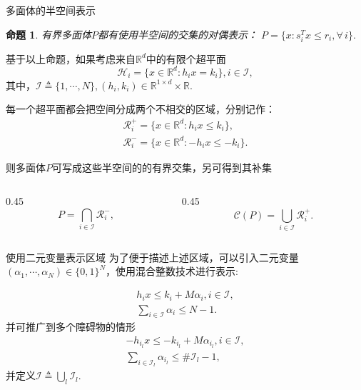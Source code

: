 \documentclass[notheorems,11pt]{beamer}
\theoremstyle{plain}
\numberwithin{theorem}{section}
\numberwithin{lemma}{section}
\newtheorem{proposition}{命题}
\numberwithin{corollary}{section}
\theoremstyle{example}
\begin{document}
\begin{frame}{多面体的半空间表示}
    \begin{proposition}{}
    有界多面体$P$都有使用半空间的交集的对偶表示：
    $P=\{x:s_i^Tx\leqslant r_i,\forall\, i\}.$
  \end{proposition}
    基于以上命题，如果考虑来自$\mathbb{R}^d$中的有限个超平面
  \begin{equation}
    \mathcal{H}_i=\{x\in\mathbb{R}^d:h_ix=k_i\},i\in\mathcal{I},
  \end{equation}
  其中，$\mathcal{I}\triangleq \{1,\cdots,N\},(h_i,k_i)\in\mathbb{R}^{1\times d}\times\mathbb{R}.$\par
  每一个超平面都会把空间分成两个不相交的区域，分别记作：
  \begin{subequations}
    \begin{gather}
    \mathcal{R}^+_i=\{x\in\mathbb{R}^d:h_ix\leqslant k_i\}, \\
    \mathcal{R}^-_i=\{x\in\mathbb{R}^d:-h_ix\leqslant -k_i\}.
  \end{gather}
  \end{subequations}\par
  则多面体$P$可写成这些半空间的的有界交集，另可得到其补集
  \begin{columns}
  \begin{column}{0.45\textwidth}
    \begin{equation}
      P=\bigcap_{i\in\mathcal{I}}{\mathcal{R}^{-}_i},
  \end{equation}
    \end{column}
    \begin{column}{0.45\textwidth}
      \begin{equation}
        \mathcal{C}(P)=\bigcup_{i\in\mathcal{I}}{\mathcal{R}^{+}_i}. \label{6}
      \end{equation}
    \end{column}
  \end{columns}
  

\end{frame}

\begin{frame}{使用二元变量表示区域}
  为了便于描述上述区域，可以引入二元变量$(\alpha_1,\cdots,\alpha_N)\in\{0,1\}^N$，使用混合整数技术进行表示:\par
  \begin{subequations}
    \label{7}
    \begin{gather}
      h_ix\leqslant k_i+M\alpha_i,i\in\mathcal{I}, \label{7.a}\\
      \sum_{i\in\mathcal{I}}{\alpha_i}\leqslant N-1.
    \end{gather}
  \end{subequations}
  并可推广到多个障碍物的情形
      \begin{subequations}
    \begin{gather}
      -h_{i_l}x\leqslant -k_{i_l}+M\alpha_{i_l},i\in\mathcal{I}, \label{9.a}\\
      \sum_{i\in\mathcal{I}_l}{\alpha_{i_l}}\leqslant \#\mathcal{I}_l-1,
    \end{gather}
  \end{subequations}
  并定义$\mathcal{I}\triangleq\bigcup_l{\mathcal{I}_l}.$
\end{frame}
\end{document}
